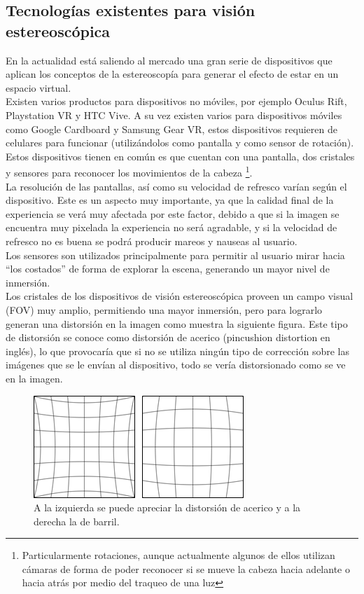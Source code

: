 \documentclass[12pt]{article}
\begin{document}
\subsection{Tecnologías existentes para visión estereoscópica}
En la actualidad está saliendo al mercado una gran serie de dispositivos que aplican los conceptos de la estereoscopía para generar el efecto de estar en un espacio virtual.
\\Existen varios productos para dispositivos no móviles, por ejemplo  Oculus Rift\cite{oculus}, Playstation VR\cite{psvr} y HTC Vive\cite{htcvive}. A su vez existen varios para dispositivos móviles como  Google Cardboard\cite{cardboard} y  Samsung Gear VR\cite{samsungvr}, estos dispositivos requieren de celulares para funcionar (utilizándolos como pantalla y como sensor de rotación).
\\Estos dispositivos tienen en común es que cuentan con una pantalla, dos cristales y sensores para reconocer los movimientos de la cabeza \footnote{Particularmente rotaciones, aunque actualmente algunos de ellos utilizan cámaras de forma de poder reconocer si se mueve la cabeza hacia adelante o hacia atrás por medio del traqueo de una luz}.
\\La resolución de las pantallas, así como su velocidad de refresco varían según el dispositivo. Este es un aspecto muy importante, ya que la calidad final de la experiencia se verá muy afectada por este factor, debido a que si la imagen se encuentra muy pixelada la experiencia no será agradable, y si la velocidad de refresco no es buena se podrá producir mareos y nauseas al usuario.
\\Los sensores son utilizados principalmente para permitir al usuario mirar hacia “los costados” de forma de explorar la escena, generando un mayor nivel de inmersión.
\\Los cristales de los dispositivos de visión estereoscópica proveen un campo visual (FOV) muy amplio, permitiendo una mayor inmersión, pero para lograrlo generan una distorsión\cite{oculusrendering} en la imagen como muestra la siguiente figura. Este tipo de distorsión se conoce como  distorsión de acerico (pincushion distortion en inglés), lo que provocaría que si no se utiliza ningún tipo de corrección sobre las imágenes que se le envían al dispositivo, todo se vería distorsionado como se ve en la imagen.
\begin{figure}[h!]
\includegraphics[width =0.6\linewidth, center]{ace-bar.png}
\caption{ A la izquierda se puede apreciar la distorsión de acerico y a la derecha la de barril.}
\label{ fig : surface }
\end{figure}
\end{document}
